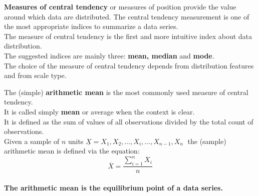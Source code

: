 
\begin{frame}
  \vspace*{.5cm}
  \textbf{Measures of central tendency} or measures of position provide the value around which data are distributed. The central tendency measurement is one of the most appropriate indices to summarize a data series.\\
  \vspace*{.5cm}
  The measure of central tendency is the first and more intuitive index about data distribution.\\
  \vspace*{.5cm}
  The suggested indices are mainly three: \textbf{mean, median} and \textbf{mode}.\\
  \vspace*{.5cm}
  The choice of the measure of central tendency depends from distribution features and from scale type.
\end{frame}


\begin{frame}
  The (simple) \textbf{arithmetic mean} is the most commonly used measure of central tendency.\\
  \vspace{.3cm}
  It is called simply \textbf{mean} or average when the context is clear. \\
  \vspace{.3cm}
  It is defined as the sum of values of all observations divided by the total count of observations. \\
  \vspace{.3cm}
  Given a sample of $ n $ units $ \underline{X} = X_1, X_2, \dots, X_i, \dots, X_{n-1}, X_n \; $ the (sample) arithmetic mean is defined via the equation: $$ \overline{X}=\frac{\sum_{i=1}^n{X_i}}{n} $$ \\
  \vspace{.3cm}
  \textbf{The arithmetic mean is the equilibrium point of a data series.}
\end{frame}

